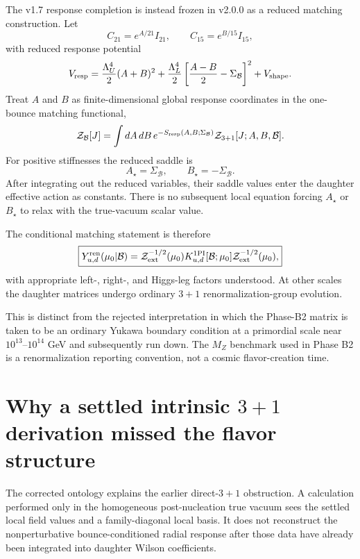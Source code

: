 \documentclass[11pt]{article}
\begin{document}
The v1.7 response completion is instead frozen in v2.0.0 as a reduced matching construction. Let
\begin{equation}
C_{21}=e^{A/21}I_{21},\qquad
C_{15}=e^{B/15}I_{15},
\end{equation}
with reduced response potential
\begin{equation}
V_{\rm resp}
=\frac{\Lambda_U^4}{2}(A+B)^2
+\frac{\Lambda_L^4}{2}\left[\frac{A-B}{2}-\Sigma_{\mathcal B}\right]^2
+V_{\rm shape}.
\end{equation}
Treat $A$ and $B$ as finite-dimensional global response coordinates in the one-bounce matching functional,
\begin{equation}
{\cal Z}_{\mathcal B}[J]
=\int dA\,dB\,e^{-S_{\rm resp}(A,B;\Sigma_{\mathcal B})}
{\cal Z}_{3+1}[J;A,B,\mathcal B].
\end{equation}
For positive stiffnesses the reduced saddle is
\begin{equation}
\boxed{A_\star=\Sigma_{\mathcal B},\qquad B_\star=-\Sigma_{\mathcal B}.}
\end{equation}
After integrating out the reduced variables, their saddle values enter the daughter effective action as constants. There is no subsequent local equation forcing $A_\star$ or $B_\star$ to relax with the true-vacuum scalar value.

The conditional matching statement is therefore
\begin{equation}
\boxed{
Y^{\rm ren}_{u,d}(\mu_0|\mathcal B)
={\cal Z}_{\rm ext}^{-1/2}(\mu_0)
K^{\rm 1PI}_{u,d}[\mathcal B;\mu_0]
{\cal Z}_{\rm ext}^{-1/2}(\mu_0),}
\end{equation}
with appropriate left-, right-, and Higgs-leg factors understood. At other scales the daughter matrices undergo ordinary $3+1$ renormalization-group evolution.

This is distinct from the rejected interpretation in which the Phase-B2 matrix is taken to be an ordinary Yukawa boundary condition at a primordial scale near $10^{13}$--$10^{14}$ GeV and subsequently run down. The $M_Z$ benchmark used in Phase B2 is a renormalization reporting convention, not a cosmic flavor-creation time.

\section{Why a settled intrinsic $3+1$ derivation missed the flavor structure}
The corrected ontology explains the earlier direct-$3+1$ obstruction. A calculation performed only in the homogeneous post-nucleation true vacuum sees the settled local field values and a family-diagonal local basis. It does not reconstruct the nonperturbative bounce-conditioned radial response after those data have already been integrated into daughter Wilson coefficients.
\end{document}
